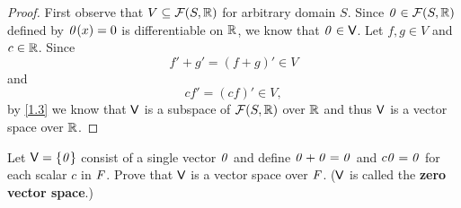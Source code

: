 \begin{proof}
  First observe that \(V \subseteq \fs{S}{\R}\) for arbitrary domain \(S\).
  Since \(\zv \in \fs{S}{\R}\) defined by \(\mathit{0}(x) = 0\) is differentiable on \(\mathbb{R}\), we know that \(\mathit{0} \in \mathsf{V}\).
  Let \(f, g \in V\) and \(c \in \mathbb{R}\).
  Since
  \[
    f' + g' = (f + g)' \in V
  \]
  and
  \[
    cf' = (cf)' \in V,
  \]
  by \cref{1.3} we know that \(\mathsf{V}\) is a subspace of \(\fs{S}{\R}\) over \(\mathbb{R}\) and thus \(\mathsf{V}\) is a vector space over \(\mathbb{R}\).
\end{proof}

\begin{ex}\label{ex:1.2.11}
  Let \(\mathsf{V} = \left\lbrace\mathit{0}\right\rbrace\) consist of a single vector \(\mathit{0}\) and define \(\mathit{0} + \mathit{0} = \mathit{0}\) and \(c\mathit{0} = \mathit{0}\) for each scalar \(c\) in \(\mathit{F}\).
  Prove that \(\mathsf{V}\) is a vector space over \(\mathit{F}\).
  (\(\mathsf{V}\) is called the \textbf{zero vector space}.)
\end{ex}

